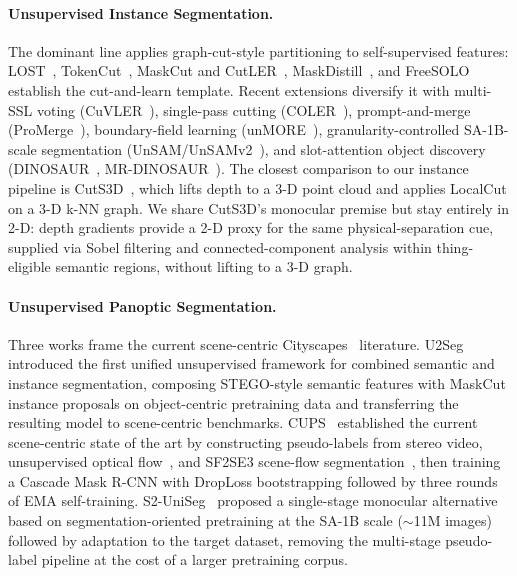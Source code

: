 \documentclass{article}
\begin{document}
\paragraph{Unsupervised Instance Segmentation.}
The dominant line applies graph-cut-style partitioning to self-supervised features: LOST~\cite{simeoni2021lost}, TokenCut~\cite{wang2023tokencut}, MaskCut and CutLER~\cite{wang2023cutler}, MaskDistill~\cite{vangansbeke2022maskdistill}, and FreeSOLO~\cite{wang2022freesolo} establish the cut-and-learn template. Recent extensions diversify it with multi-SSL voting (CuVLER~\cite{arica2024cuvler}), single-pass cutting (COLER~\cite{feng2025coler}), prompt-and-merge (ProMerge~\cite{li2024promerge}), boundary-field learning (unMORE~\cite{yang2025unmore}), granularity-controlled SA-1B-scale segmentation (UnSAM/UnSAMv2~\cite{wang2024unsam,yu2025unsamv2}), and slot-attention object discovery (DINOSAUR~\cite{seitzer2023dinosaur}, MR-DINOSAUR~\cite{gong2025mrdinosaur}). The closest comparison to our instance pipeline is CutS3D~\cite{sick2025cuts3d}, which lifts depth to a 3-D point cloud and applies LocalCut on a 3-D k-NN graph. We share CutS3D's monocular premise but stay entirely in 2-D: depth gradients provide a 2-D proxy for the same physical-separation cue, supplied via Sobel filtering and connected-component analysis within thing-eligible semantic regions, without lifting to a 3-D graph.

\paragraph{Unsupervised Panoptic Segmentation.}
Three works frame the current scene-centric Cityscapes~\cite{cordts2016cityscapes} literature. U2Seg~\cite{niu2024u2seg} introduced the first unified unsupervised framework for combined semantic and instance segmentation, composing STEGO-style semantic features with MaskCut instance proposals on object-centric pretraining data and transferring the resulting model to scene-centric benchmarks. CUPS~\cite{hahn2025cups} established the current scene-centric state of the art by constructing pseudo-labels from stereo video, unsupervised optical flow~\cite{stone2021smurf}, and SF2SE3 scene-flow segmentation~\cite{sommer2022sf2se3}, then training a Cascade Mask R-CNN with DropLoss bootstrapping followed by three rounds of EMA self-training. S2-UniSeg~\cite{xu2025s2uniseg} proposed a single-stage monocular alternative based on segmentation-oriented pretraining at the SA-1B scale ($\sim$11M images) followed by adaptation to the target dataset, removing the multi-stage pseudo-label pipeline at the cost of a larger pretraining corpus.
\end{document}
